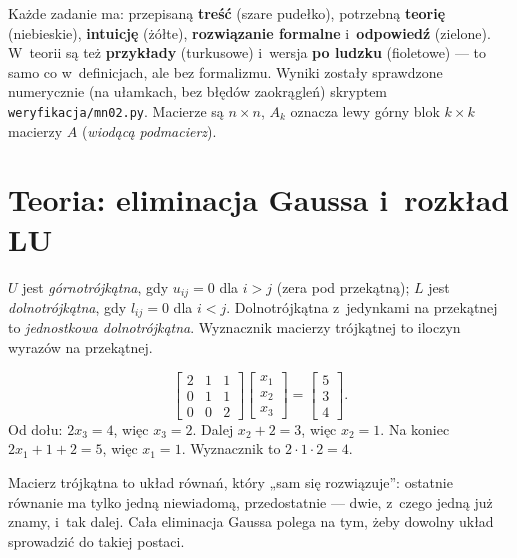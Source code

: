 \documentclass[11pt]{article}
\begin{document}

\begin{teoria}
Każde zadanie ma: przepisaną \textbf{treść} (szare pudełko), potrzebną
\textbf{teorię} (niebieskie), \textbf{intuicję} (żółte), \textbf{rozwiązanie
formalne} i~\textbf{odpowiedź} (zielone). W~teorii są też
\textbf{przykłady} (turkusowe) i~wersja \textbf{po ludzku} (fioletowe) ---
to samo co w~definicjach, ale bez formalizmu. Wyniki zostały sprawdzone
numerycznie (na ułamkach, bez błędów zaokrągleń) skryptem
\texttt{weryfikacja/mn02.py}. Macierze są $n\times n$, $A_k$ oznacza
lewy górny blok $k\times k$ macierzy $A$ (\emph{wiodącą podmacierz}).
\end{teoria}

\section{Teoria: eliminacja Gaussa i~rozkład LU}

\begin{definicja}
$U$ jest \emph{górnotrójkątna}, gdy $u_{ij}=0$ dla $i>j$ (zera pod
przekątną); $L$ jest \emph{dolnotrójkątna}, gdy $l_{ij}=0$ dla $i<j$.
Dolnotrójkątna z~jedynkami na przekątnej to \emph{jednostkowa dolnotrójkątna}.
Wyznacznik macierzy trójkątnej to iloczyn wyrazów na przekątnej.
\end{definicja}

\begin{przyklad}
\[
\begin{bmatrix}2&1&1\\0&1&1\\0&0&2\end{bmatrix}
\begin{bmatrix}x_1\\x_2\\x_3\end{bmatrix}
=\begin{bmatrix}5\\3\\4\end{bmatrix}.
\]
Od dołu: $2x_3=4$, więc $x_3=2$. Dalej $x_2+2=3$, więc $x_2=1$.
Na koniec $2x_1+1+2=5$, więc $x_1=1$. Wyznacznik to $2\cdot1\cdot2=4$.
\end{przyklad}

\begin{poludzku}
Macierz trójkątna to układ równań, który „sam się rozwiązuje”: ostatnie
równanie ma tylko jedną niewiadomą, przedostatnie --- dwie, z~czego jedną
już znamy, i~tak dalej. Cała eliminacja Gaussa polega na tym, żeby
dowolny układ sprowadzić do takiej postaci.
\end{poludzku}
\end{document}
